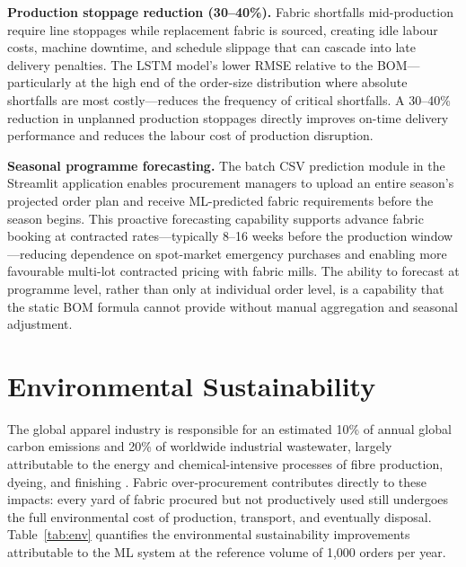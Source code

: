 \textbf{Production stoppage reduction (30--40\%).} Fabric shortfalls mid-production require line stoppages while replacement fabric is sourced, creating idle labour costs, machine downtime, and schedule slippage that can cascade into late delivery penalties. The LSTM model's lower RMSE relative to the BOM---particularly at the high end of the order-size distribution where absolute shortfalls are most costly---reduces the frequency of critical shortfalls. A 30--40\% reduction in unplanned production stoppages directly improves on-time delivery performance and reduces the labour cost of production disruption.

\textbf{Seasonal programme forecasting.} The batch CSV prediction module in the Streamlit application enables procurement managers to upload an entire season's projected order plan and receive ML-predicted fabric requirements before the season begins. This proactive forecasting capability supports advance fabric booking at contracted rates---typically 8--16 weeks before the production window---reducing dependence on spot-market emergency purchases and enabling more favourable multi-lot contracted pricing with fabric mills. The ability to forecast at programme level, rather than only at individual order level, is a capability that the static BOM formula cannot provide without manual aggregation and seasonal adjustment.

\secdiv
\section{Environmental Sustainability}
\label{sec:env}

The global apparel industry is responsible for an estimated 10\% of annual global carbon emissions and 20\% of worldwide industrial wastewater, largely attributable to the energy and chemical-intensive processes of fibre production, dyeing, and finishing \cite{world2023textile}. Fabric over-procurement contributes directly to these impacts: every yard of fabric procured but not productively used still undergoes the full environmental cost of production, transport, and eventually disposal. Table~\ref{tab:env} quantifies the environmental sustainability improvements attributable to the ML system at the reference volume of 1{,}000 orders per year.

